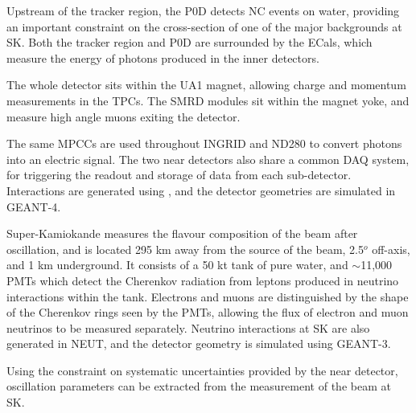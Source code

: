 Upstream of the tracker region, the P0D detects NC events on water, providing an important constraint on the cross-section of one of the major backgrounds at SK. Both the tracker region and P0D are surrounded by the ECals, which measure the energy of photons produced in the inner detectors.

The whole detector sits within the UA1 magnet, allowing charge and momentum measurements in the TPCs. The SMRD modules sit within the magnet yoke, and measure high angle muons exiting the detector.

The same MPCCs are used throughout INGRID and ND280 to convert photons into an electric signal. The two near detectors also share a common DAQ system, for triggering the readout and storage of data from each sub-detector. Interactions are generated using , and the detector geometries are simulated in \textsc{GEANT-4}. 

Super-Kamiokande measures the flavour composition of the beam after oscillation, and is located 295 km away from the source of the beam, 2.5$^o$ off-axis, and 1 km underground. It consists of a 50 kt tank of pure water, and $\sim$11,000 PMTs which detect the Cherenkov radiation from leptons produced in neutrino interactions within the tank. Electrons and muons are distinguished by the shape of the Cherenkov rings seen by the PMTs, allowing the flux of electron and muon neutrinos to be measured separately. Neutrino interactions at SK are also generated in \textsc{NEUT}, and the detector geometry is simulated using \textsc{GEANT-3}.

Using the constraint on systematic uncertainties provided by the near detector, oscillation parameters can be extracted from the measurement of the beam at SK.

\newpage